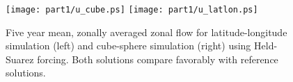 \begin{figure}
 \begin{center}
   \texttt{[image: part1/u\_cube.ps]}
   \texttt{[image: part1/u\_latlon.ps]}
 \end{center}
\caption{Five year mean, zonally averaged zonal flow for latitude-longitude
simulation (left) and cube-sphere simulation (right) using Held-Suarez
forcing. Both solutions compare favorably with reference solutions.}
\label{fig:hs_zave_u}
\end{figure}
